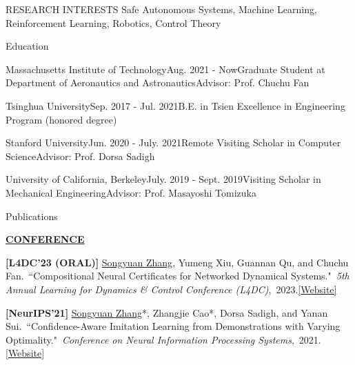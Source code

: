 \documentclass{resume} %
\newcommand{\paperItem}[4]{#1.~``#2."~\textit{#3},~#4.}%
\newcommand{\me}{\underline{Songyuan Zhang}}
\newcommand{\meshort}{\textbf{S. Zhang}}
\newcommand{\person}[2]{#1}
\begin{document}
	\begin{rSection}{RESEARCH INTERESTS}
		Safe Autonomous Systems, Machine Learning, Reinforcement Learning, Robotics, Control Theory
	\end{rSection}

	\begin{rSection}{Education} 		
		\begin{rSubsection2}{Massachusetts Institute of Technology}{Aug. 2021 - Now}{Graduate Student at Department of Aeronautics and Astronautics}{Advisor: Prof. Chuchu Fan}
		\end{rSubsection2} 
	
		\begin{rSubsection2}{Tsinghua University}{Sep. 2017 - Jul. 2021}{B.E. in Tsien Excellence in Engineering Program (honored degree)}{\\} 
		\end{rSubsection2}
		\vspace{-10pt}
        
        \begin{rSubsection2}{Stanford University}{Jun. 2020 - July. 2021}{Remote Visiting Scholar in Computer Science}{Advisor: Prof. Dorsa Sadigh}
		\end{rSubsection2}

		\begin{rSubsection2}{University of California, Berkeley}{July. 2019 - Sept. 2019}{Visiting Scholar in Mechanical Engineering}{Advisor: Prof. Masayoshi Tomizuka}
		\end{rSubsection2}
	\end{rSection}

	\begin{rSection}{Publications}
		\item[] \textbf{\underline{CONFERENCE}}
		\vspace{5pt}
		{
			\item {\bf [L4DC'23 (ORAL)]}
			\paperItem{\person{\me}{\meshort}, \person{Yumeng Xiu}{Y. Xiu}, \person{Guannan Qu}{G. Qu}, and \person{Chuchu Fan}{C. Fan}}{Compositional Neural Certificates for Networked Dynamical Systems}{5th Annual Learning for Dynamics \& Control Conference (L4DC)}{2023}{\href{https://mit-realm.github.io/neuriss-website/}{[Website]}}
			\item {\bf [NeurIPS'21]}
			\paperItem{\person{\me*}{\meshort}, \person{Zhangjie Cao*}{Z. Cao}, \person{Dorsa Sadigh}{D. Sadigh}, and \person{Yanan Sui}{Y. Sui}}{Confidence-Aware Imitation Learning from Demonstrations with Varying Optimality}{Conference on Neural Information Processing Systems}{2021}{\href{https://sites.google.com/view/cail/}{[Website]}}
		}
	\end{rSection}
\end{document}
